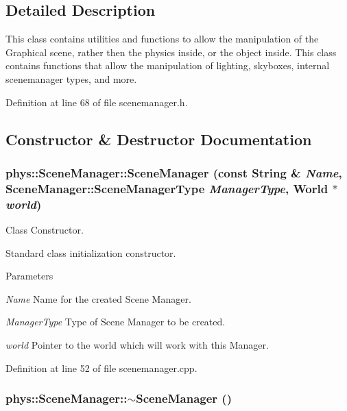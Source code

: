 \subsection{Detailed Description}
This class contains utilities and functions to allow the manipulation of the Graphical scene, rather then the physics inside, or the object inside. This class contains functions that allow the manipulation of lighting, skyboxes, internal scenemanager types, and more. 

Definition at line 68 of file scenemanager.h.



\subsection{Constructor \& Destructor Documentation}
\hypertarget{classphys_1_1SceneManager_a3fc6eca0c09240141e6d7c0b0165e8fb}{
\subsubsection[{SceneManager}]{\setlength{\rightskip}{0pt plus 5cm}phys::SceneManager::SceneManager (const {\bf String} \& {\em Name}, \/  SceneManager::SceneManagerType {\em ManagerType}, \/  {\bf World} $\ast$ {\em world})}}
\label{dd/da8/classphys_1_1SceneManager_a3fc6eca0c09240141e6d7c0b0165e8fb}


Class Constructor. 

Standard class initialization constructor. 
\begin{DoxyParams}{Parameters}
\item[{\em Name}]Name for the created Scene Manager. \item[{\em ManagerType}]Type of Scene Manager to be created. \item[{\em world}]Pointer to the world which will work with this Manager. \end{DoxyParams}


Definition at line 52 of file scenemanager.cpp.

\hypertarget{classphys_1_1SceneManager_a5076643eec92dc0c9c9ccb7ac2225cde}{
\subsubsection[{$\sim$SceneManager}]{\setlength{\rightskip}{0pt plus 5cm}phys::SceneManager::$\sim$SceneManager ()}}
\label{dd/da8/classphys_1_1SceneManager_a5076643eec92dc0c9c9ccb7ac2225cde}


